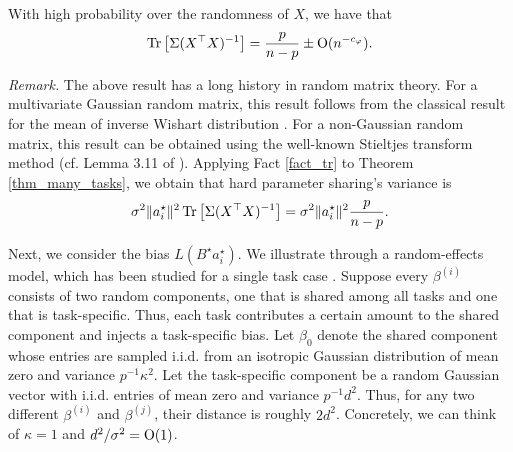 \begin{fact}\label{fact_tr}
	With high probability over the randomness of $X$, we have that
		\[ \operatorname{Tr}\left[\Sigma (X^{\top} X)^{-1}\right] = \frac{p}{n - p} \pm \operatorname{O}(n^{-c_{\varphi}}). \]
\end{fact}
\textit{Remark.} The above result has a long history in random matrix theory.
For a multivariate Gaussian random matrix, this result follows from the classical result for the mean of inverse Wishart distribution \cite{anderson1958introduction}.
For a non-Gaussian random matrix, this result can be obtained using the well-known Stieltjes transform method (cf. Lemma 3.11 of \citet{bai2009spectral}).
Applying Fact \ref{fact_tr} to Theorem \ref{thm_many_tasks}, we obtain that hard parameter sharing's variance is
		\[ \sigma^2 \|a^{\star}_i\|^2 \operatorname{Tr}\left[\Sigma (X^{\top} X)^{-1}\right] = \sigma^2 \|a^{\star}_i\|^2 \frac{p}{n- p}. \]


Next, we consider the bias $L(B^{\star} a^{\star}_i)$.
We illustrate through a random-effects model, which has been studied for a single task case \cite{dobriban2020wonder}.
Suppose every $\beta^{(i)}$ consists of two random components, one that is shared among all tasks and one that is task-specific.
Thus, each task contributes a certain amount to the shared component and injects a task-specific bias.
Let $\beta_0$ denote the shared component whose entries are sampled i.i.d. from an isotropic Gaussian distribution of mean zero and variance $p^{-1}\kappa^2$.
Let the task-specific component be a random Gaussian vector with i.i.d. entries of mean zero and variance $p^{-1} d^2$.
Thus, for any two different $\beta^{(i)}$ and $\beta^{(j)}$, their distance is roughly $2d^2$.
Concretely, we can think of $\kappa = 1$ and $d^2/\sigma^2 = \operatorname{O}(1)$.

